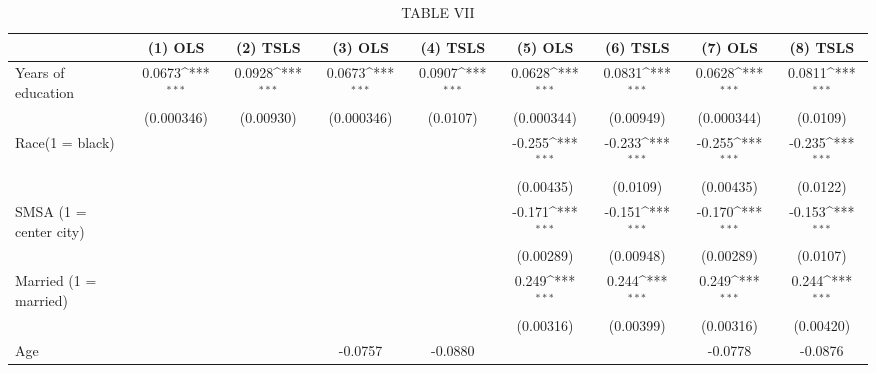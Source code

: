 \begin{table}[htbp]\centering
\def\sym#1{\ifmmode^{#1}\else\(^{#1}\)\fi}
\caption{TABLE VII}
\begin{tabular}{l*{8}{c}}
\hline\hline
                         &\multicolumn{1}{c}{(1) OLS}&\multicolumn{1}{c}{(2) TSLS}&\multicolumn{1}{c}{(3) OLS}&\multicolumn{1}{c}{(4) TSLS}&\multicolumn{1}{c}{(5) OLS}&\multicolumn{1}{c}{(6) TSLS}&\multicolumn{1}{c}{(7) OLS}&\multicolumn{1}{c}{(8) TSLS}\\
\hline
Years of education       &      0.0673\sym{***}&      0.0928\sym{***}&      0.0673\sym{***}&      0.0907\sym{***}&      0.0628\sym{***}&      0.0831\sym{***}&      0.0628\sym{***}&      0.0811\sym{***}\\
                         &  (0.000346)         &   (0.00930)         &  (0.000346)         &    (0.0107)         &  (0.000344)         &   (0.00949)         &  (0.000344)         &    (0.0109)         \\
[1em]
Race(1 = black)          &                     &                     &                     &                     &      -0.255\sym{***}&      -0.233\sym{***}&      -0.255\sym{***}&      -0.235\sym{***}\\
                         &                     &                     &                     &                     &   (0.00435)         &    (0.0109)         &   (0.00435)         &    (0.0122)         \\
[1em]
SMSA (1 = center city)   &                     &                     &                     &                     &      -0.171\sym{***}&      -0.151\sym{***}&      -0.170\sym{***}&      -0.153\sym{***}\\
                         &                     &                     &                     &                     &   (0.00289)         &   (0.00948)         &   (0.00289)         &    (0.0107)         \\
[1em]
Married (1 = married)    &                     &                     &                     &                     &       0.249\sym{***}&       0.244\sym{***}&       0.249\sym{***}&       0.244\sym{***}\\
                         &                     &                     &                     &                     &   (0.00316)         &   (0.00399)         &   (0.00316)         &   (0.00420)         \\
[1em]
Age                      &                     &                     &     -0.0757         &     -0.0880         &                     &                     &     -0.0778         &     -0.0876         \\

\end{tabular}
\end{table}
